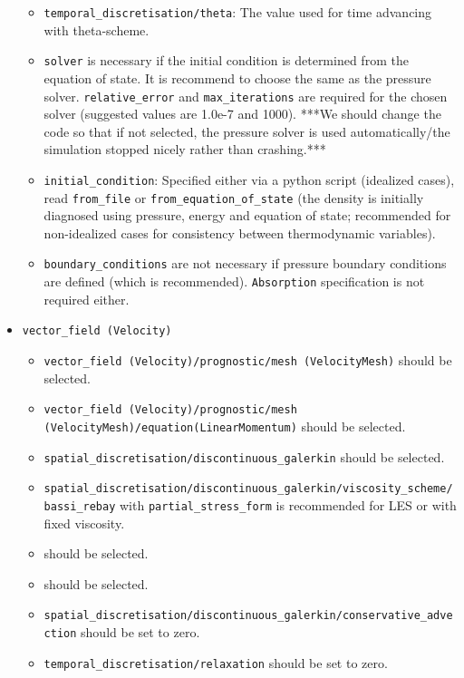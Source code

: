 \documentclass[10pt,a4paper]{article}
\begin{document}
\begin{itemize}
\begin{itemize}
\item \texttt{temporal\_discretisation/theta}: The value used for time advancing with theta-scheme.
\item \texttt{solver} is necessary if the initial condition is determined from the equation of state. It is recommend to choose the same as the pressure solver. \texttt{relative\_error} and \texttt{max\_iterations} are required for the chosen solver (suggested values are 1.0e-7 and 1000). ***We should change the code so that if not selected, the pressure solver is used automatically/the simulation stopped nicely rather than crashing.***
\item \texttt{initial\_condition}: Specified either via a python script (idealized cases), read \texttt{from\_file} or \texttt{from\_equation\_of\_state} (the density is initially diagnosed using pressure, energy and equation of state; recommended for non-idealized cases for consistency between thermodynamic variables).
\item \texttt{boundary\_conditions} are not necessary if pressure boundary conditions are defined (which is recommended). \texttt{Absorption} specification is not required either.
\end{itemize}
\item \texttt{vector\_field (Velocity)}
\begin{itemize}
\item \texttt{vector\_field (Velocity)/prognostic/mesh (VelocityMesh)} should be selected.
\item \texttt{vector\_field (Velocity)/prognostic/mesh (VelocityMesh)/equation(LinearMomentum)} should be selected.
\item \texttt{spatial\_discretisation/discontinuous\_galerkin} should be selected.
\item \texttt{spatial\_discretisation/discontinuous\_galerkin/viscosity\_scheme/bassi\_rebay} with \texttt{partial\_stress\_form} is recommended for LES or with fixed viscosity.
\item \texttt{} should be selected.
\item \texttt{} should be selected.
\item \texttt{spatial\_discretisation/discontinuous\_galerkin/conservative\_advection} should be set to zero.
\item \texttt{temporal\_discretisation/relaxation} should be set to zero.

\end{itemize}
\end{itemize}
\end{document}
